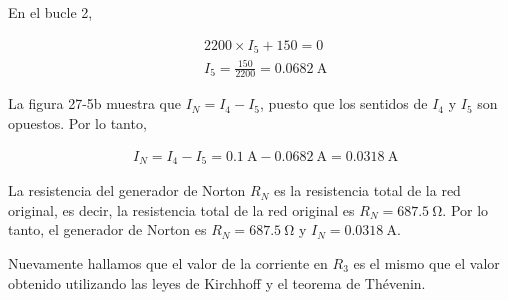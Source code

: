 En el bucle 2, 

\begin{equation}
\begin{split}
    &2200 \times I_5 + 150 = 0 \\
    &I_5 = \frac{150}{2200} = \SI{0.0682}{\ampere}
\end{split} \tag{27-17}
\end{equation}

La figura 27-5b muestra que $I_N=I_4-I_5$, puesto que los sentidos de 
$I_4$ y $I_5$ son opuestos. Por lo tanto,

\begin{equation}
\begin{split}
    &I_N = I_4 - I_5 = \SI{0.1}{\ampere} - \SI{0.0682}{\ampere} = \SI{0.0318}{\ampere}
\end{split} \tag{27-18}
\end{equation}  

La resistencia del generador de Norton $R_N$ es la resistencia total de 
la red original, es decir, la resistencia total de la red original es 
$R_N=\SI{687.5}{\ohm}$. Por lo tanto, el generador de Norton 
es $R_N=\SI{687.5}{\ohm}$ y $I_N=\SI{0.0318}{\ampere}$.

Nuevamente hallamos que el valor de la corriente en $R_3$ es el mismo que 
el valor obtenido utilizando las leyes de Kirchhoff y el teorema de 
Thévenin.

